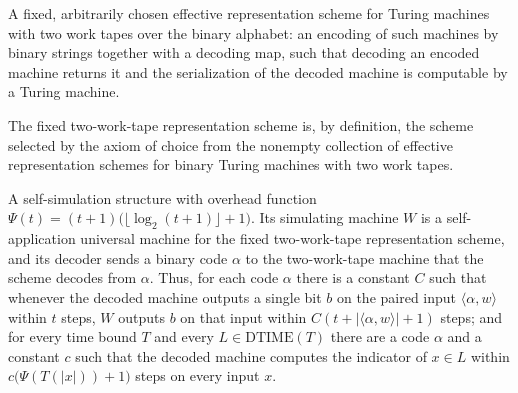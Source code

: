 \begin{definition}
\label{Complexity.TimeHierarchy.code₂}
\leanok
{}
A fixed, arbitrarily chosen effective representation scheme for Turing machines with two
work tapes over the binary alphabet: an encoding of such machines by binary strings
together with a decoding map, such that decoding an encoded machine returns it and the
serialization of the decoded machine is computable by a Turing machine.
\end{definition}

\begin{theorem}
\label{Complexity.TimeHierarchy.code₂_eq}
\leanok
{}
The fixed two-work-tape representation scheme is, by definition, the scheme selected by
the axiom of choice from the nonempty collection of effective representation schemes for
binary Turing machines with two work tapes.
\end{theorem}

\begin{definition}
\label{Complexity.TimeHierarchy.twoTapeSelfSimulator}
\leanok
{}
A self-simulation structure with overhead function
$\Psi(t) = (t+1)\bigl(\lfloor\log_2(t+1)\rfloor+1\bigr)$. Its simulating machine $W$ is a
self-application universal machine for the fixed two-work-tape representation scheme, and
its decoder sends a binary code $\alpha$ to the two-work-tape machine that the scheme decodes
from $\alpha$. Thus, for each code $\alpha$ there is a constant $C$ such that whenever the
decoded machine outputs a single bit $b$ on the paired input $\langle\alpha,w\rangle$ within
$t$ steps, $W$ outputs $b$ on that input within $C(t+|\langle\alpha,w\rangle|+1)$ steps; and
for every time bound $T$ and every $L\in\mathrm{DTIME}(T)$ there are a code $\alpha$ and a
constant $c$ such that the decoded machine computes the indicator of $x\in L$ within
$c\bigl(\Psi(T(|x|))+1\bigr)$ steps on every input $x$.
\end{definition}

